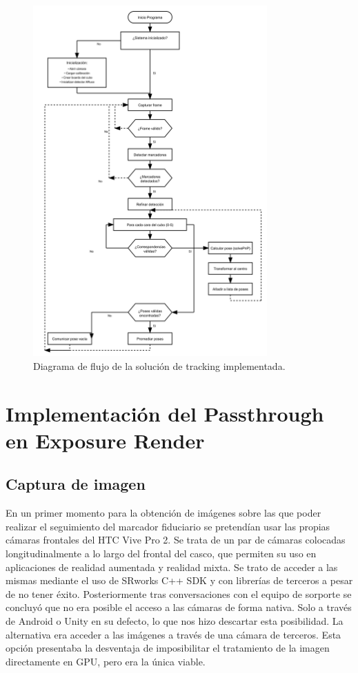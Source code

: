 \begin{figure}
	\centering
	\includegraphics[width=0.8\textwidth]{imaxes/flujo_tfg_correcto.png}
	\caption{Diagrama de flujo de la solución de tracking implementada.}
	\label{fig:flujo_tfg}
\end{figure}

\section{Implementación del Passthrough en Exposure Render}
\subsection{Captura de imagen}
En un primer momento para la obtención de imágenes sobre las que poder realizar el seguimiento del marcador fiduciario se pretendían usar las propias cámaras frontales del HTC Vive Pro 2. Se trata de un par de cámaras colocadas longitudinalmente a lo largo del frontal del casco, que permiten su uso en aplicaciones de realidad aumentada y realidad mixta.
Se trato de acceder a las mismas mediante el uso de SRworks C++ SDK y con librerías de terceros a pesar de no tener éxito. Posteriormente tras conversaciones con el equipo de sorporte se concluyó que no era posible el acceso a las cámaras de forma nativa. Solo a través de Android o Unity en su defecto, lo que nos hizo descartar esta posibilidad.
La alternativa era acceder a las imágenes a través de una cámara de terceros. Esta opción presentaba la desventaja de imposibilitar el tratamiento de la imagen directamente en GPU, pero era la única viable.

